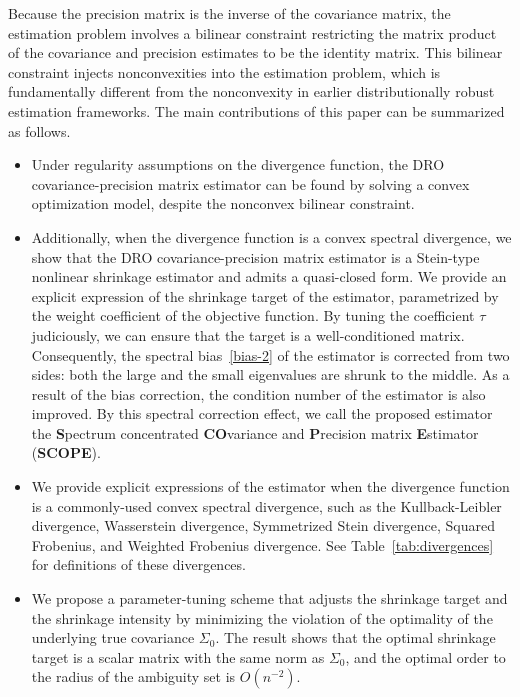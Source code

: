\documentclass[11pt]{article}
\begin{document}
 Because the precision matrix is the inverse of the covariance matrix, the estimation problem involves a bilinear constraint restricting the matrix product of the covariance and precision estimates to be the identity matrix. This bilinear constraint injects nonconvexities into the estimation problem, which is fundamentally different from the nonconvexity in earlier distributionally robust estimation frameworks.
The main contributions of this paper can be summarized as follows.
\begin{itemize}
    \item Under regularity assumptions on the divergence function, the DRO covariance-precision matrix estimator can be found by solving a convex optimization model, despite the nonconvex bilinear constraint. 
    
    \item Additionally, when the divergence function is a convex spectral divergence, we show that the DRO covariance-precision matrix estimator is a Stein-type nonlinear shrinkage estimator and admits a quasi-closed form.
    We provide an explicit expression of the shrinkage target of the estimator, parametrized by the weight coefficient of the objective function. By tuning the coefficient $\tau$ judiciously, we can ensure that the target is a well-conditioned matrix. Consequently, the spectral bias~\eqref{bias-2} of the estimator is corrected from two sides: both the large and the small eigenvalues are shrunk to the middle. As a result of the bias correction, the condition number of the estimator is also improved. By this spectral correction effect, we call the proposed estimator the \textbf{S}pectrum concentrated \textbf{CO}variance and \textbf{P}recision matrix \textbf{E}stimator (\textbf{SCOPE}).
    \item We provide explicit expressions of the estimator when the divergence function is a commonly-used convex spectral divergence, such as the Kullback-Leibler divergence, Wasserstein divergence, Symmetrized Stein divergence, Squared Frobenius, and Weighted Frobenius divergence. See Table~\ref{tab:divergences} for definitions of these divergences.
    \item We propose a parameter-tuning scheme that adjusts the shrinkage target and the shrinkage intensity by minimizing the violation of the optimality of the underlying true covariance $\Sigma_0$. The result shows that the optimal shrinkage target is a scalar matrix with the same norm as $\Sigma_0$, and the optimal order to the radius of the ambiguity set is $O(n^{-2})$. 
\end{itemize}
\end{document}
